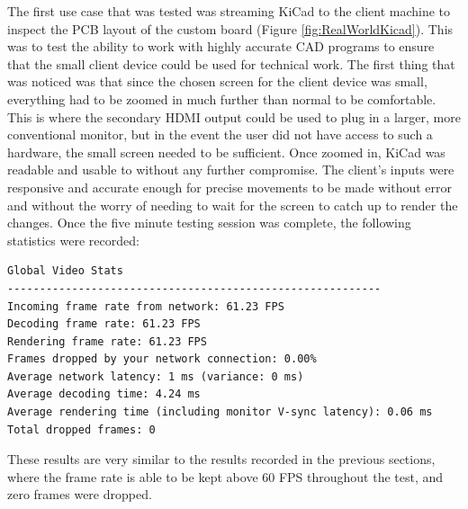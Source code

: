 The first use case that was tested was streaming KiCad to the client machine to inspect the PCB layout of the custom board (Figure \ref{fig:RealWorldKicad}).
This was to test the ability to work with highly accurate CAD programs to ensure that the small client device could be used for technical work.
The first thing that was noticed was that since the chosen screen for the client device was small, everything had to be zoomed in much further than normal to be comfortable.
This is where the secondary HDMI output could be used to plug in a larger, more conventional monitor, but in the event the user did not have access to such a hardware, the small screen needed to be sufficient.
Once zoomed in, KiCad was readable and usable to without any further compromise.
The client's inputs were responsive and accurate enough for precise movements to be made without error and without the worry of needing to wait for the screen to catch up to render the changes.
Once the five minute testing session was complete, the following statistics were recorded:

\begin{lstlisting}[style=plaintext,title=Statistics recorded while streaming KiCad (Figure \ref{fig:RealWorldKicad})]
Global Video Stats
----------------------------------------------------------
Incoming frame rate from network: 61.23 FPS
Decoding frame rate: 61.23 FPS
Rendering frame rate: 61.23 FPS
Frames dropped by your network connection: 0.00%
Average network latency: 1 ms (variance: 0 ms)
Average decoding time: 4.24 ms
Average rendering time (including monitor V-sync latency): 0.06 ms
Total dropped frames: 0
\end{lstlisting}

These results are very similar to the results recorded in the previous sections, where the frame rate is able to be kept above 60 FPS throughout the test, and zero frames were dropped.

